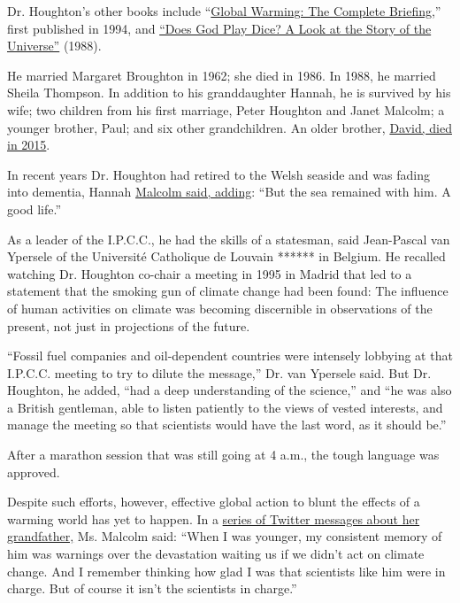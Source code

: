 Dr. Houghton's other books include
``\href{https://www.amazon.com/gp/product/1107463793?ie=UTF8\&tag=thewaspos09-20\&camp=1789\&linkCode=xm2\&creativeASIN=1107463793}{Global
Warming: The Complete Briefing},'' first published in 1994, and
\href{https://www.amazon.com/Does-Play-Dice-Story-Universe/dp/0310515718}{``Does
God Play Dice? A Look at the Story of the Universe''} (1988).

He married Margaret Broughton in 1962; she died in 1986. In 1988, he
married Sheila Thompson. In addition to his granddaughter Hannah, he is
survived by his wife; two children from his first marriage, Peter
Houghton and Janet Malcolm; a younger brother, Paul; and six other
grandchildren. An older brother,
\href{https://rmets.onlinelibrary.wiley.com/doi/pdf/10.1002/wea.2566}{David,
died in 2015}.

In recent years Dr. Houghton had retired to the Welsh seaside and was
fading into dementia, Hannah
\href{https://twitter.com/hannahmmalcolm/status/1250778581476749314}{Malcolm
said, adding}: ``But the sea remained with him. A good life.''

As a leader of the I.P.C.C., he had the skills of a statesman, said
Jean-Pascal van Ypersele of the Université Catholique de Louvain ******
in Belgium. He recalled watching Dr. Houghton co-chair a meeting in 1995
in Madrid that led to a statement that the smoking gun of climate change
had been found: The influence of human activities on climate was
becoming discernible in observations of the present, not just in
projections of the future.

``Fossil fuel companies and oil-dependent countries were intensely
lobbying at that I.P.C.C. meeting to try to dilute the message,'' Dr.
van Ypersele said. But Dr. Houghton, he added, ``had a deep
understanding of the science,'' and ``he was also a British gentleman,
able to listen patiently to the views of vested interests, and manage
the meeting so that scientists would have the last word, as it should
be.''

After a marathon session that was still going at 4 a.m., the tough
language was approved.

Despite such efforts, however, effective global action to blunt the
effects of a warming world has yet to happen. In a
\href{https://twitter.com/hannahmmalcolm/status/1250778576405880833}{series
of Twitter messages about her grandfather,} Ms. Malcolm said: ``When I
was younger, my consistent memory of him was warnings over the
devastation waiting us if we didn't act on climate change. And I
remember thinking how glad I was that scientists like him were in
charge. But of course it isn't the scientists in charge.''

